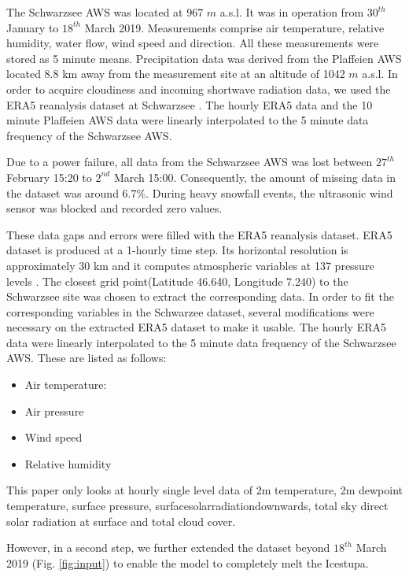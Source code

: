 \documentclass[utf8]{frontiersSCNS} %
\begin{document}
The Schwarzsee AWS was located at 967 $m$ a.s.l. It was in operation from $30^{th}$  January to $18^{th}$ March 2019.
Measurements comprise air temperature, relative humidity, water flow, wind speed and direction. All these measurements
were stored as 5 minute means. Precipitation data was derived from the Plaffeien AWS \citep{meteoswiss} located 8.8 km
away from the measurement site at an altitude of 1042 $m$ a.s.l. In order to acquire cloudiness and incoming shortwave
radiation data, we used the ERA5 reanalysis dataset at Schwarzsee \citep{era5}. The hourly ERA5 data and the 10 minute
Plaffeien AWS data were linearly interpolated to the 5 minute data frequency of the Schwarzsee AWS. 

Due to a power failure, all data from the Schwarzsee AWS was lost between $27^{th}$ February 15:20 to $2^{nd}$ March
15:00. Consequently, the amount of missing data in the dataset was around 6.7\%.  During heavy snowfall events, the
ultrasonic wind sensor was blocked and recorded zero values. 

These data gaps and errors were filled with the ERA5 reanalysis dataset. ERA5 dataset is produced at a 1-hourly time
step. Its horizontal resolution is approximately 30 km and it computes atmospheric variables at 137 pressure levels
\citep{ERA5_2020}. The closest grid point(Latitude 46.640, Longitude 7.240) to the Schwarzsee site was chosen to
extract the corresponding data. In order to fit the corresponding variables in the Schwarzee dataset, several
modifications were necessary on the extracted ERA5 dataset to make it usable. The hourly ERA5 data were linearly
interpolated to the 5 minute data frequency of the Schwarzsee AWS. These are listed as follows: 

\begin{itemize} \item
Air temperature: \item Air pressure \item Wind speed \item Relative humidity \end{itemize}

This paper only looks at hourly
single level data of 2m temperature, 2m dewpoint temperature, surface pressure, surfacesolarradiationdownwards,
total sky direct solar radiation at surface and total cloud cover.

However, in a
second step, we further extended the dataset beyond $18^{th}$ March 2019 (Fig.  \ref{fig:input}) to enable the model to
completely melt the Icestupa.
\end{document}
